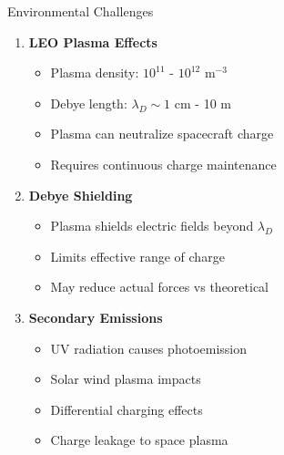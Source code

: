 \documentclass[aspectratio=169]{beamer}
\begin{document}
\begin{frame}{Environmental Challenges}
\begin{enumerate}
    \item \textbf{LEO Plasma Effects}
    \begin{itemize}
        \item Plasma density: $10^{11}$ - $10^{12}$ m$^{-3}$
        \item Debye length: $\lambda_D \sim 1$ cm - 10 m
        \item Plasma can neutralize spacecraft charge
        \item Requires continuous charge maintenance
    \end{itemize}

    \item \textbf{Debye Shielding}
    \begin{itemize}
        \item Plasma shields electric fields beyond $\lambda_D$
        \item Limits effective range of charge
        \item May reduce actual forces vs theoretical
    \end{itemize}

    \item \textbf{Secondary Emissions}
    \begin{itemize}
        \item UV radiation causes photoemission
        \item Solar wind plasma impacts
        \item Differential charging effects
        \item Charge leakage to space plasma
    \end{itemize}
\end{enumerate}
\end{frame}
\end{document}
